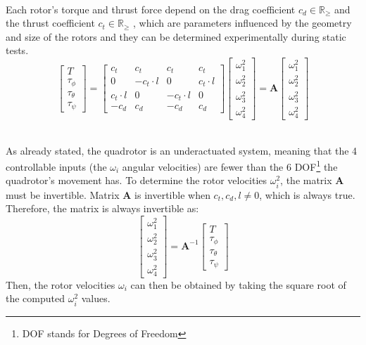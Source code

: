 \documentclass[main]{subfiles}
\begin{document}
\noindent\\
Each rotor’s torque and thrust force depend on the drag 
coefficient \( c_d \in \mathbb{R}_\geq \) and the thrust coefficient 
\( c_t \in \mathbb{R}_\geq \) \cite{geometric_control}, which are parameters influenced by the 
geometry and size of the rotors and they can be determined experimentally 
during static tests.
\[
\begin{bmatrix}
T \\
\tau_\phi \\
\tau_\theta \\
\tau_\psi
\end{bmatrix}
=
\begin{bmatrix}
 c_t & c_t & c_t & c_t \\
    0 & -c_t \cdot l & 0 & c_t \cdot l \\
 c_t \cdot l & 0 & -c_t \cdot l & 0 \\
 -c_d & c_d & -c_d & c_d
\end{bmatrix}
\begin{bmatrix}
\omega_1^2 \\
\omega_2^2 \\
\omega_3^2 \\
\omega_4^2
\end{bmatrix}
= 
\mathbf{A}
\begin{bmatrix}
    \omega_1^2 \\
    \omega_2^2 \\
    \omega_3^2 \\
    \omega_4^2
\end{bmatrix}
\]

\noindent\\
As already stated, the quadrotor is an underactuated system, 
meaning that the 4 controllable inputs (the \( \omega_i \) angular velocities) are 
fewer than the 6 DOF\footnote{DOF stands for Degrees of Freedom} the quadrotor's movement has. 
To determine the rotor velocities \( \omega_i^2 \), 
the matrix \( \mathbf{A} \) must be invertible.
Matrix \( \mathbf{A} \) is invertible when \( c_t, c_d, l \neq 0 \), which is always true. 
Therefore, the matrix is always invertible as:
\begin{equation}
\begin{bmatrix}
\omega_1^2 \\
\omega_2^2 \\
\omega_3^2 \\
\omega_4^2
\end{bmatrix}
=
\mathbf{A}^{-1}
\begin{bmatrix}
T \\
\tau_\phi \\
\tau_\theta \\
\tau_\psi
\end{bmatrix}
\label{eq:rotor_velocities}
\end{equation}
Then, the rotor velocities \( \omega_i \) can then be obtained by 
taking the square root of the computed \( \omega_i^2 \) values.
\end{document}
